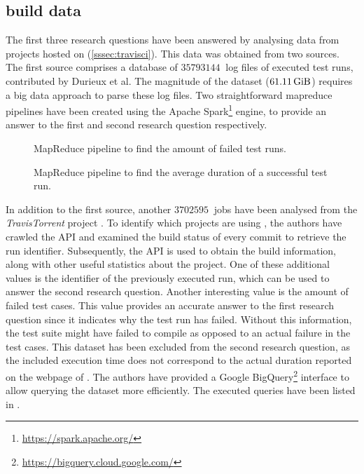 
\subsection{\travisci{} build data}
The first three research questions have been answered by analysing data from projects hosted on \travisci{} (\cref{sssec:travisci}). This data was obtained from two sources.\\

\noindent The first source comprises a database \cite{travisanalysis} of $\SI{35793144}{}$ log files of executed test runs, contributed by Durieux et al. The magnitude of the dataset ($\SI{61.11}{\gibi\byte}$) requires a big data approach to parse these log files. Two straightforward \Gls{mapreduce} pipelines have been created using the Apache Spark\footnote{\url{https://spark.apache.org/}} engine, to provide an answer to the first and second research question respectively.\\

\begin{figure}[htbp!]
	\centering
	
	\caption{MapReduce pipeline to find the amount of failed test runs.}
	\label{fig:eval-mapreduce-1}
\end{figure}

\begin{figure}[htbp!]
	\centering
	
	\caption{MapReduce pipeline to find the average duration of a successful test run.}
	\label{fig:eval-mapreduce-2}
\end{figure}

\noindent In addition to the first source, another $\SI{3702595}{}$ jobs have been analysed from the \mbox{\emph{TravisTorrent}} project \cite{msr17challenge}. To identify which projects are using \travisci{}, the authors have crawled the \github{} API and examined the build status of every commit to retrieve the run identifier. Subsequently, the \travisci{} API is used to obtain the build information, along with other useful statistics about the project. One of these additional values is the identifier of the previously executed run, which can be used to answer the second research question. Another interesting value is the amount of failed test cases. This value provides an accurate answer to the first research question since it indicates why the test run has failed. Without this information, the test suite might have failed to compile as opposed to an actual failure in the test cases. This dataset has been excluded from the second research question, as the included execution time does not correspond to the actual duration reported on the webpage of \travisci{}. The authors have provided a Google BigQuery\footnote{\url{https://bigquery.cloud.google.com/}} interface to allow querying the dataset more efficiently. The executed queries have been listed in .